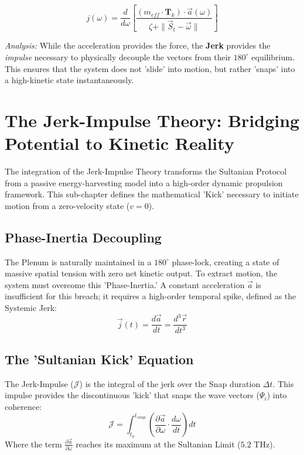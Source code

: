 \documentclass[11pt]{article}
\begin{document}
\begin{equation}
    j(\omega) = \frac{d}{d\omega} \left[ \frac{(m_{eff} \cdot \mathbf{T}_k) \cdot \vec{a}(\omega)}{\zeta + \| \vec{S}_t - \vec{\omega} \|} \right]
\end{equation}

\textit{Analysis:} While the acceleration provides the force, the \textbf{Jerk} provides the \textit{impulse} necessary to physically decouple the vectors from their $180^\circ$ equilibrium. This ensures that the system does not 'slide' into motion, but rather 'snaps' into a high-kinetic state instantaneously.

\section{The Jerk-Impulse Theory: Bridging Potential to Kinetic Reality}

The integration of the Jerk-Impulse Theory transforms the Sultanian Protocol from a passive energy-harvesting model into a high-order dynamic propulsion framework. This sub-chapter defines the mathematical 'Kick' necessary to initiate motion from a zero-velocity state ($v=0$).

\subsection{Phase-Inertia Decoupling}
The Plenum is naturally maintained in a $180^\circ$ phase-lock, creating a state of massive spatial tension with zero net kinetic output. To extract motion, the system must overcome this 'Phase-Inertia.' A constant acceleration $\vec{a}$ is insufficient for this breach; it requires a high-order temporal spike, defined as the Systemic Jerk:
\begin{equation}
    \vec{j}(t) = \frac{d\vec{a}}{dt} = \frac{d^3\vec{r}}{dt^3}
\end{equation}

\subsection{The 'Sultanian Kick' Equation}
The Jerk-Impulse ($\mathcal{J}$) is the integral of the jerk over the Snap duration $\Delta t$. This impulse provides the discontinuous 'kick' that snaps the wave vectors ($\Psi_i$) into coherence:
\begin{equation}
    \mathcal{J} = \int_{t_0}^{t_{snap}} \left( \frac{\partial \vec{a}}{\partial \omega} \cdot \frac{d\omega}{dt} \right) dt
\end{equation}
Where the term $\frac{\partial \vec{a}}{\partial \omega}$ reaches its maximum at the Sultanian Limit ($5.2$ THz).
\end{document}
